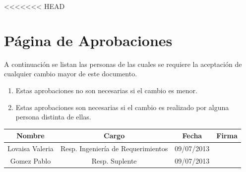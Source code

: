 
<<<<<<< HEAD
\section{\textcolor[gray]{.2}{Página de Aprobaciones}}
A continuación se listan las personas de las cuales se requiere la aceptación de cualquier cambio mayor de este documento.
\begin{enumerate}
  \item Estas aprobaciones no son necesarias si el cambio es menor.
  \item Estas aprobaciones son necesarias si el cambio es realizado por alguna
  persona distinta de ellas.
\end{enumerate}
\begin{table}[h!]
\begin{center}
\begin{tabular}{|c|c|c|c|}
\hline
\rowcolor[gray]{.8} Nombre & Cargo & Fecha & Firma\\
\hline
Lovaisa Valeria & Resp. Ingeniería de Requerimientos & 09/07/2013 & \\
\hline
Gomez Pablo & Resp. Suplente & 09/07/2013 & \\
\hline
\end{tabular}
\end{center}
\end{table}


